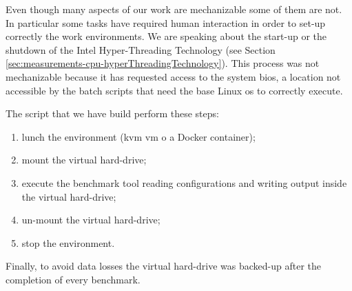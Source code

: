 Even though many aspects of our work are mechanizable some of them are not. In particular some tasks have
required human interaction in order to set-up correctly the work environments. We are speaking about the
start-up or the shutdown of the Intel Hyper-Threading Technology (see Section
\ref{sec:measurements-cpu-hyperThreadingTechnology}). This process was not mechanizable because it has
requested access to the system \acs{bios}, a location not accessible by the batch scripts that need the
base Linux \acs{os} to correctly execute.

The script that we have build perform these steps:

\begin{enumerate}
	\item{lunch the environment (\ac{kvm} \ac{vm} o a Docker container);}
	\item{mount the virtual hard-drive;}
	\item{execute the benchmark tool reading configurations and writing output inside the virtual
		hard-drive;}
	\item{un-mount the virtual hard-drive;}
	\item{stop the environment.}
\end{enumerate}

Finally, to avoid data losses the virtual hard-drive was backed-up after the completion of every
benchmark.